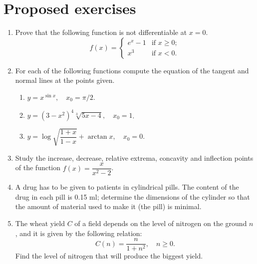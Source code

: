 \section{Proposed exercises}
\begin{enumerate}[leftmargin=*]
\item Prove that the following function is not differentiable at $x=0$.
\[
f(x)=
\begin{cases}
e^x-1 & \mbox{if $x\geq 0$};  \\
x^3 & \mbox{if $x<0$}.
\end{cases}
\]

\item For each of the following functions compute the equation of the tangent and normal lines at the points given. 
\begin{enumerate}
\item  $y=x^{\sin x},\quad x_{0}=\pi/2$.
\item  $y=(3-x^2)^4\sqrt[3]{5x-4},\quad x_{0}=1$.
\item  $y=\log \sqrt{\dfrac{1+x}{1-x}}+\arctan x, \quad x_{0}=0$.
\end{enumerate}

\item Study the increase, decrease, relative extrema, concavity and inflection points of the function $f(x)=\dfrac{x}{x^2-2}$. 

\item A drug has to be given to patients in cylindrical pills.
The content of the drug in each pill is 0.15 ml; determine the dimensions of the cylinder so that the amount of material used to make it (the pill) is minimal.

\item The wheat yield $C$ of a field depends on the level of nitrogen on the ground $n$, and it is given by the following relation:
\[
C(n) = \frac{n}{1+n^2},\quad n\geq 0.
\]
Find the level of nitrogen that will produce the biggest yield.
\end{enumerate}
